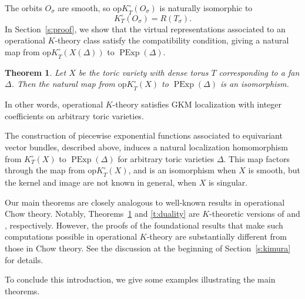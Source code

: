 \documentclass[11pt]{amsart}
\newtheorem{theorem}{Theorem}[section]
\theoremstyle{definition}
\begin{document}
The orbits $O_\sigma$ are smooth, so ${\mathrm{op}K}^\circ_T(O_\sigma)$ is naturally isomorphic to
\[
K^\circ_T(O_\sigma) = R(T_\sigma).
\]
In Section~\ref{s:proof}, we show that the virtual representations associated to an operational $K$-theory class satisfy the compatibility condition, giving a natural map from ${\mathrm{op}K}^\circ_T(X(\Delta))$ to $\operatorname{PExp}(\Delta)$.

\begin{theorem} \label{t:plp}
Let $X$ be the toric variety with dense torus $T$ corresponding to a fan $\Delta$.  Then the natural map from ${\mathrm{op}K}^\circ_T(X)$ to $\operatorname{PExp}(\Delta)$ is an isomorphism.
\end{theorem}

\noindent In other words, operational $K$-theory satisfies GKM localization with integer coefficients on arbitrary toric varieties.  

The construction of piecewise exponential functions associated to equivariant vector bundles, described above, induces a natural localization homomorphism from $K^\circ_T(X)$ to $\operatorname{PExp}(\Delta)$ for arbitrary toric varieties $\Delta$.  This map factors through the map from ${\mathrm{op}K}_T^\circ(X)$, and is an isomorphism when $X$ is smooth, but the kernel and image are not known in general, when $X$ is singular.

\medskip
Our main theorems are closely analogous to well-known results in operational Chow theory.  Notably, Theorems~\ref{t:plp} and \ref{t:duality} are $K$-theoretic versions of \cite[Theorem~1]{chow} and \cite[Theorem~2]{totaro}, respectively.   However, the proofs of the foundational results that make such computations possible in operational $K$-theory are substantially different from those in Chow theory.  See the discussion at the beginning of Section~\ref{s:kimura} for details.

\medskip

To conclude this introduction, we give some examples illustrating the main theorems.
\end{document}
